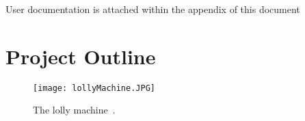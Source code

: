         User documentation is attached within the appendix of this document

\section{Project Outline}

    \begin{figure}[ht]
        \centering
        \texttt{[image: lollyMachine.JPG]}
        \caption{The lolly machine~\cite{thesisJodie}.}
        \label{fig:lollyMachine}
    \end{figure}
